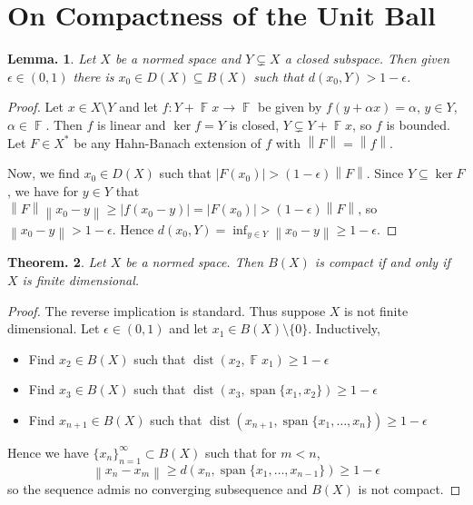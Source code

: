 \documentclass[11pt, a4paper]{memoir}
\DeclareMathOperator{\F}{{\mathbb{F}}}
\newcommand{\norm}[1]{\ensuremath{\left\lVert#1\right\rVert}}
\theoremstyle{change}
\newtheorem{theorem}{Theorem.}[section]
\newtheorem{lemma}[theorem]{Lemma.}
\theoremstyle{plain}
\theoremstyle{nonumberplain}
\newtheorem{proof}{Proof}
\DeclareMathOperator{\spn}{span}
\DeclareMathOperator{\dist}{dist}
\numberwithin{equation}{section}
\begin{document}
\section{On Compactness of the Unit Ball}
\begin{lemma}
    Let $X$ be a normed space and $Y\subsetneq X$ a closed subspace.
    Then given $\epsilon\in(0,1)$ there is $x_0\in D(X)\subseteq B(X)$ such that $d(x_0,Y)>1-\epsilon$.
\end{lemma}
\begin{proof}
    Let $x\in X\setminus Y$ and let $f:Y+\F x\to\F$ be given by $f(y+\alpha x)=\alpha$, $y\in Y$, $\alpha\in \F$.
    Then $f$ is linear and $\ker f=Y$ is closed, $Y\subsetneq Y+\F x$, so $f$ is bounded.
    Let $F\in X^*$ be any Hahn-Banach extension of $f$ with $\norm{F}=\norm{f}$.

    Now, we find $x_0\in D(X)$ such that $|F(x_0)|>(1-\epsilon)\norm{F}$.
    Since $Y\subseteq\ker F$, we have for $y\in Y$ that $\norm{F}\norm{x_0-y}\geq|f(x_0-y)|=|F(x_0)|>(1-\epsilon)\norm{F}$, so $\norm{x_0-y}>1-\epsilon$.
    Hence $d(x_0,Y)=\inf_{y\in Y}\norm{x_0-y}\geq 1-\epsilon$.
\end{proof}
\begin{theorem}
    Let $X$ be a normed space.
    Then $B(X)$ is compact if and only if $X$ is finite dimensional.
\end{theorem}
\begin{proof}
    The reverse implication is standard.
    Thus suppose $X$ is not finite dimensional.
    Let $\epsilon\in(0,1)$ and let $x_1\in B(X)\setminus\{0\}$.
    Inductively,
    \begin{itemize}[nl]
        \item Find $x_2\in B(X)$ such that $\dist(x_2,\F x_1)\geq 1-\epsilon$
        \item Find $x_3\in B(X)$ such that $\dist(x_3,\spn\{x_1,x_2\})\geq 1-\epsilon$
        \item Find $x_{n+1}\in B(X)$ such that $\dist(x_{n+1},\spn\{x_1,\ldots,x_n\})\geq 1-\epsilon$
    \end{itemize}
    Hence we have $\{x_n\}_{n=1}^\infty\subset B(X)$ such that for $m<n$,
    \begin{equation*}
        \norm{x_n-x_m}\geq d(x_n,\spn\{x_1,\ldots,x_{n-1}\})\geq 1-\epsilon
    \end{equation*}
    so the sequence admis no converging subsequence and $B(X)$ is not compact.
\end{proof}
\end{document}
